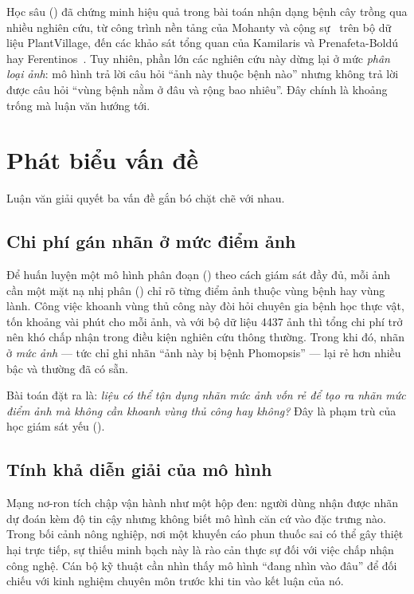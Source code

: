 Học sâu () đã chứng minh hiệu quả trong bài toán nhận dạng bệnh
cây trồng qua nhiều nghiên cứu, từ công trình nền tảng của Mohanty và cộng
sự~\cite{mohanty2016plantdisease} trên bộ dữ liệu PlantVillage, đến các khảo sát
tổng quan của Kamilaris và Prenafeta-Boldú~\cite{kamilaris2018survey} hay
Ferentinos~\cite{ferentinos2018plantdisease}. Tuy nhiên, phần lớn các nghiên cứu
này dừng lại ở mức \emph{phân loại ảnh}: mô hình trả lời câu hỏi ``ảnh này thuộc
bệnh nào'' nhưng không trả lời được câu hỏi ``vùng bệnh nằm ở đâu và rộng bao
nhiêu''. Đây chính là khoảng trống mà luận văn hướng tới.

\section{Phát biểu vấn đề}
\label{sec:vande}

Luận văn giải quyết ba vấn đề gắn bó chặt chẽ với nhau.

\subsection{Chi phí gán nhãn ở mức điểm ảnh}

Để huấn luyện một mô hình phân đoạn () theo cách giám sát đầy đủ,
mỗi ảnh cần một mặt nạ nhị phân () chỉ rõ từng điểm ảnh thuộc vùng
bệnh hay vùng lành. Công việc khoanh vùng thủ công này đòi hỏi chuyên gia bệnh
học thực vật, tốn khoảng vài phút cho mỗi ảnh, và với bộ dữ liệu \num{4437} ảnh
thì tổng chi phí trở nên khó chấp nhận trong điều kiện nghiên cứu thông thường.
Trong khi đó, nhãn ở \emph{mức ảnh} --- tức chỉ ghi nhãn ``ảnh này bị bệnh
Phomopsis'' --- lại rẻ hơn nhiều bậc và thường đã có sẵn.

Bài toán đặt ra là: \emph{liệu có thể tận dụng nhãn mức ảnh vốn rẻ để tạo ra
nhãn mức điểm ảnh mà không cần khoanh vùng thủ công hay không?} Đây là phạm trù
của học giám sát yếu ().

\subsection{Tính khả diễn giải của mô hình}

Mạng nơ-ron tích chập vận hành như một hộp đen: người dùng nhận được nhãn dự đoán
kèm độ tin cậy nhưng không biết mô hình căn cứ vào đặc trưng nào. Trong bối cảnh
nông nghiệp, nơi một khuyến cáo phun thuốc sai có thể gây thiệt hại trực tiếp,
sự thiếu minh bạch này là rào cản thực sự đối với việc chấp nhận công nghệ. Cán
bộ kỹ thuật cần nhìn thấy mô hình ``đang nhìn vào đâu'' để đối chiếu với kinh
nghiệm chuyên môn trước khi tin vào kết luận của nó.

